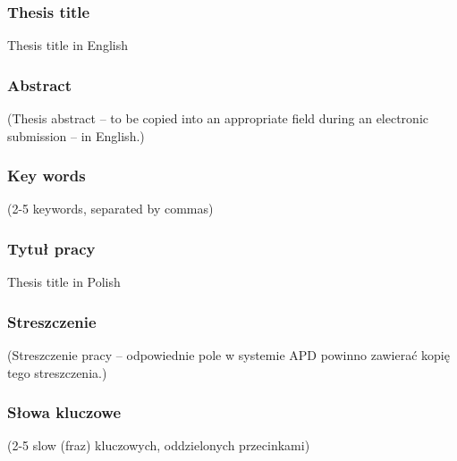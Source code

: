 \documentclass[a4paper,twoside,12pt]{book}
\newcommand{\Title}{Thesis title in English}
\newcommand{\TitleAlt}{Thesis title in Polish}
\begin{document}

\cleardoublepage
 
\rmfamily\normalfont
\pagestyle{empty}

  

\subsubsection*{Thesis title}  
\Title

\subsubsection*{Abstract} 
(Thesis abstract – to be copied into an appropriate field during an electronic submission – in English.)

\subsubsection*{Key words}  
(2-5 keywords, separated by commas)

\subsubsection*{Tytuł pracy}
\begin{otherlanguage}{polish}
\TitleAlt
\end{otherlanguage}

\subsubsection*{Streszczenie} 
\begin{otherlanguage}{polish}
(Streszczenie pracy – odpowiednie pole w systemie APD powinno zawierać kopię tego streszczenia.)
\end{otherlanguage}

\subsubsection*{Słowa kluczowe} 
\begin{otherlanguage}{polish}
(2-5 slow (fraz) kluczowych, oddzielonych przecinkami)
\end{otherlanguage}


\thispagestyle{empty}
\tableofcontents
\thispagestyle{empty}
\end{document}
